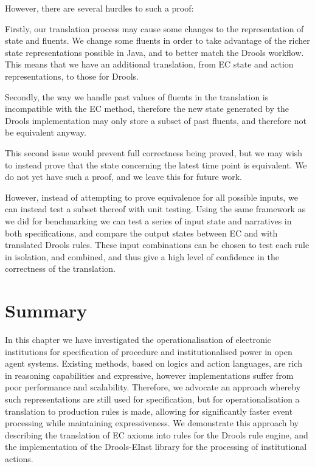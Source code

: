 However, there are several hurdles to such a proof:

Firstly, our translation process may cause some changes to the representation
of state and fluents. We change some fluents in order to take advantage of the
richer state representations possible in Java, and to better match the Drools
workflow. This means that we have an additional translation, from \ac{EC}
state and action representations, to those for Drools.

Secondly, the way we handle past values of fluents in the translation is
incompatible with the \ac{EC} method, therefore the new state generated by the
Drools implementation may only store a subset of past fluents, and therefore
not be equivalent anyway.


This second issue would prevent full correctness being proved, but we may wish
to instead prove that the state concerning the latest time point is
equivalent. We do not yet have such a proof, and we leave this for future work.

However, instead of attempting to prove equivalence for all possible inputs,
we can instead test a subset thereof with unit testing. Using the same
framework as we did for benchmarking we can test a series of input state and
narratives in both specifications, and compare the output states between
\ac{EC} and with translated Drools rules. These input combinations can be
chosen to test each rule in isolation, and combined, and thus give a high
level of confidence in the correctness of the translation.

\section{Summary}

In this chapter we have investigated the operationalisation of electronic
institutions for specification of procedure and institutionalised power in
open agent systems. Existing methods, based on logics and action languages,
are rich in reasoning capabilities and expressive, however implementations
suffer from poor performance and scalability. Therefore, we advocate an
approach whereby such representations are still used for specification, but
for operationalisation a translation to production rules is made, allowing for
significantly faster event processing while maintaining expressiveness. We demonstrate this approach by
describing the translation of \ac{EC} axioms into rules for the Drools rule
engine, and the implementation of the Drools-EInst library for the processing
of institutional actions.

